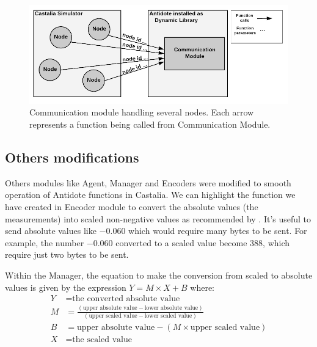 \begin{figure}[htbp]
\centerline{\includegraphics[scale=0.31]{figures/communicationModule.png}}
\caption{Communication module handling several nodes. Each arrow represents a function being called from Communication Module.}
\label{fig:communicationModuleCastalia}
\end{figure}

\subsection{Others modifications}

Others modules like Agent, Manager and Encoders were modified to smooth operation of Antidote functions in Castalia. We can highlight the function we have created in Encoder module to convert the absolute values (the measurements) into scaled non-negative values as recommended by \cite{b1}.
It's useful to send absolute values like $-0.060$  which would require many bytes to be sent. For example, the number $-0.060$ converted to a scaled value become $388$, which require just two bytes to be sent.

Within the Manager, the equation to make the conversion from scaled to absolute values is given by the expression $Y = M \times X + B$ where:
\begin{align*}
    Y &= \text{the converted absolute value}\\
    M &= \frac{(\text{upper absolute value} - \text{lower absolute value})}{(\text{upper scaled value} - \text{lower scaled value})}\\
    B &= \text{upper absolute value} - (M \times \text{upper scaled value})\\
    X &= \text{the scaled value}
\end{align*}

